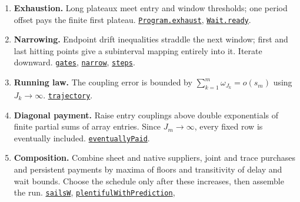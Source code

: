 \documentclass[
  letterpaper,
  11pt]{article}
\providecommand{\tightlist}{%
  \setlength{\itemsep}{0pt}\setlength{\parskip}{0pt}}
\begin{document}
\begin{enumerate}
\def\labelenumi{\arabic{enumi}.}
\tightlist
\item
  \textbf{Exhaustion.} Long plateaux meet entry and window thresholds;
  one period offset pays the finite first plateau.
  \href{https://github.com/yang-mills-group/OpenAI-YM-20261028/blob/3456e5e75cf8d4cd558955a5c7638fba2d68f464/YM/Price/Waits.lean\#L41-L84}{\texttt{Program.exhaust}},
  \href{https://github.com/yang-mills-group/OpenAI-YM-20261028/blob/3456e5e75cf8d4cd558955a5c7638fba2d68f464/YM/Price/Waits.lean\#L137-L239}{\texttt{Wait.ready}}.
\item
  \textbf{Narrowing.} Endpoint drift inequalities straddle the next
  window; first and last hitting points give a subinterval mapping
  entirely into it. Iterate downward.
  \href{https://github.com/yang-mills-group/OpenAI-YM-20261028/blob/3456e5e75cf8d4cd558955a5c7638fba2d68f464/YM/Shoot/Reach.lean\#L81-L90}{\texttt{gates}},
  \href{https://github.com/yang-mills-group/OpenAI-YM-20261028/blob/3456e5e75cf8d4cd558955a5c7638fba2d68f464/YM/Shoot/Reach.lean\#L18-L49}{\texttt{narrow}},
  \href{https://github.com/yang-mills-group/OpenAI-YM-20261028/blob/3456e5e75cf8d4cd558955a5c7638fba2d68f464/YM/Shoot/Reach.lean\#L112-L154}{\texttt{steps}}.
\item
  \textbf{Running law.} The coupling error is bounded by
  \(\sum_{k=1}^m\omega_{J_k}=o(s_m)\) using \(J_k\to\infty\).
  \href{https://github.com/yang-mills-group/OpenAI-YM-20261028/blob/3456e5e75cf8d4cd558955a5c7638fba2d68f464/YM/Shoot/Race.lean\#L23-L53}{\texttt{trajectory}}.
\item
  \textbf{Diagonal payment.} Raise entry couplings above double
  exponentials of finite partial sums of array entries. Since
  \(J_m\to\infty\), every fixed row is eventually included.
  \href{https://github.com/yang-mills-group/OpenAI-YM-20261028/blob/3456e5e75cf8d4cd558955a5c7638fba2d68f464/YM/Integration/NativeDiagonalClockRequest.lean\#L52-L79}{\texttt{eventuallyPaid}}.
\item
  \textbf{Composition.} Combine sheet and native suppliers, joint and
  trace purchases and persistent payments by maxima of floors and
  transitivity of delay and wait bounds. Choose the schedule only after
  these increases, then assemble the run.
  \href{https://github.com/yang-mills-group/OpenAI-YM-20261028/blob/3456e5e75cf8d4cd558955a5c7638fba2d68f464/YM/FullVolume/Roll/Fiscal.lean\#L97-L169}{\texttt{sailsW}},
  \href{https://github.com/yang-mills-group/OpenAI-YM-20261028/blob/3456e5e75cf8d4cd558955a5c7638fba2d68f464/YM/Integration/RG05Preconstruction/Bardo.lean\#L26-L81}{\texttt{plentifulWithPrediction}},

\end{enumerate}
\end{document}
